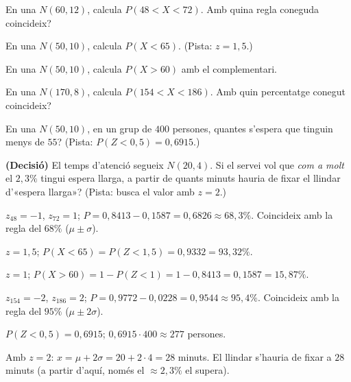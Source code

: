 \begin{exercicis}
\begin{exlist}
  \item En una $N(60,12)$, calcula $P(48<X<72)$. Amb quina regla coneguda coincideix?
  \item En una $N(50,10)$, calcula $P(X<65)$. (Pista: $z=1,5$.)
  \item En una $N(50,10)$, calcula $P(X>60)$ amb el complementari.
  \item En una $N(170,8)$, calcula $P(154<X<186)$. Amb quin percentatge conegut
        coincideix?
  \item En una $N(50,10)$, en un grup de $400$ persones, quantes s'espera que tinguin
        menys de $55$? (Pista: $P(Z<0,5)=0,6915$.)
  \item \textbf{(Decisió)} El temps d'atenció segueix $N(20,4)$. Si el servei vol que
        \emph{com a molt} el $2,3\%$ tingui espera llarga, a partir de quants minuts
        hauria de fixar el llindar d'«espera llarga»? (Pista: busca el valor amb
        $z=2$.)
\end{exlist}
\end{exercicis}

\begin{solucions}
\begin{sollist}
  \item $z_{48}=-1$, $z_{72}=1$; $P=0,8413-0,1587=0,6826\approx 68,3\%$. Coincideix amb
        la regla del $68\%$ ($\mu\pm\sigma$).
  \item $z=1,5$; $P(X<65)=P(Z<1,5)=0,9332=93,32\%$.
  \item $z=1$; $P(X>60)=1-P(Z<1)=1-0,8413=0,1587=15,87\%$.
  \item $z_{154}=-2$, $z_{186}=2$; $P=0,9772-0,0228=0,9544\approx 95,4\%$. Coincideix amb
        la regla del $95\%$ ($\mu\pm 2\sigma$).
  \item $P(Z<0,5)=0,6915$; $0,6915\cdot 400\approx 277$ persones.
  \item Amb $z=2$: $x=\mu+2\sigma=20+2\cdot 4=28$ minuts. El llindar s'hauria de fixar a
        $28$ minuts (a partir d'aquí, només el $\approx 2,3\%$ el supera).
\end{sollist}
\end{solucions}
